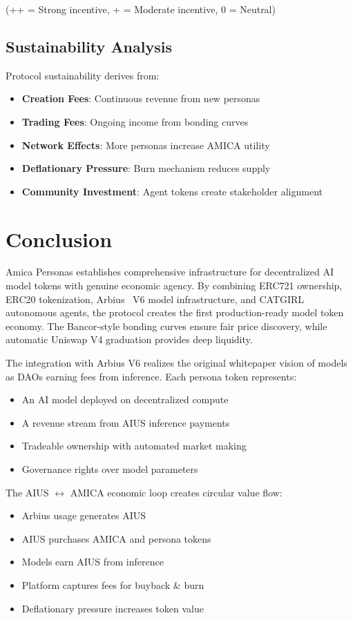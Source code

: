 \documentclass{article}
\begin{document}
(++ = Strong incentive, + = Moderate incentive, 0 = Neutral)

\subsection{Sustainability Analysis}

Protocol sustainability derives from:
\begin{itemize}
    \item \textbf{Creation Fees}: Continuous revenue from new personas
    \item \textbf{Trading Fees}: Ongoing income from bonding curves
    \item \textbf{Network Effects}: More personas increase AMICA utility
    \item \textbf{Deflationary Pressure}: Burn mechanism reduces supply
    \item \textbf{Community Investment}: Agent tokens create stakeholder alignment
\end{itemize}

\section{Conclusion}

Amica Personas establishes comprehensive infrastructure for decentralized AI model tokens with genuine economic agency. By combining ERC721 ownership, ERC20 tokenization, Arbius~\cite{arbius2023} V6 model infrastructure, and CATGIRL~\cite{catgirl2025} autonomous agents, the protocol creates the first production-ready model token economy. The Bancor-style bonding curves ensure fair price discovery, while automatic Uniswap V4 graduation provides deep liquidity.

The integration with Arbius V6 realizes the original whitepaper vision of models as DAOs earning fees from inference. Each persona token represents:
\begin{itemize}
    \item An AI model deployed on decentralized compute
    \item A revenue stream from AIUS inference payments
    \item Tradeable ownership with automated market making
    \item Governance rights over model parameters
\end{itemize}

The AIUS $\leftrightarrow$ AMICA economic loop creates circular value flow:
\begin{itemize}
    \item Arbius usage generates AIUS
    \item AIUS purchases AMICA and persona tokens
    \item Models earn AIUS from inference
    \item Platform captures fees for buyback \& burn
    \item Deflationary pressure increases token value
\end{itemize}
\end{document}
